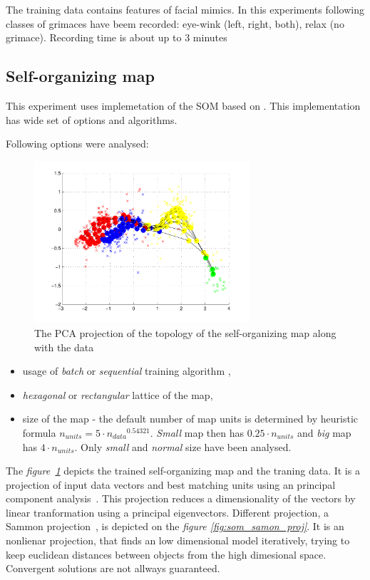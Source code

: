 \documentclass[a4paper]{IEEEtran}
\begin{document}
The training data contains features of facial mimics. In this experiments
following classes of grimaces have beem recorded: eye-wink (left, right, both), 
relax (no grimace).
Recording time is about up to 3 minutes

\subsection{Self-organizing map}
\label{sec:ex_som}
This experiment uses implemetation of the SOM based on \cite{somtoolbox}.
This implementation has wide set of options and algorithms.

Following options were analysed:
\begin{figure}[!b]
	\centering
	\includegraphics[width=80mm]{som_topol_proj}
	\caption{The PCA projection of the topology of the self-organizing map along with the data}
	\label{fig:som_topol_proj}
\end{figure}
\begin{itemize}
	\item usage of \textit{batch} or \textit{sequential} training algorithm 
	\cite{somtoolbox},
	\item \textit{hexagonal} or \textit{rectangular} lattice of the map,
	\item size of the map - the default number of map units is determined by heuristic formula 
	$ n_{units} = 5\cdot {n_{data}}^{0.54321} $. \textit{Small} map then
	has $ 0.25\cdot n_{units} $ and \textit{big} map has $ 4\cdot n_{units} $. Only
	\textit{small} and \textit{normal} size have been analysed.
\end{itemize}

The \textit{figure~\ref{fig:som_topol_proj}} depicts the trained self-organizing map and the traning data.
It is a  projection of input data vectors and best matching units using an principal component analysis~\cite{pca}.
This projection reduces a dimensionality of the vectors by linear tranformation using a principal eigenvectors.
Different projection, a Sammon projection~\cite{sammon}, is depicted on the \textit{figure \ref{fig:som_samon_proj}}.
It is an nonlienar projection, that finds an low dimensional model iteratively,
trying to keep euclidean distances between objects from the high dimesional space.
Convergent solutions are not allways guaranteed.
\end{document}
